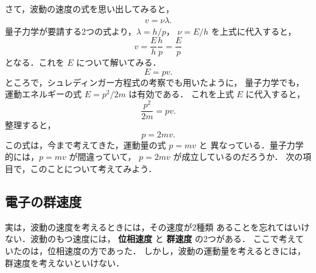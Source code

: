                 さて，波動の速度の式を思い出してみると，
                    \begin{align}
                        v  =  \nu \lambda.
                    \end{align}
                量子力学が要請する2つの式より，$\lambda = h/p$，
                $\nu = E/h$ を上式に代入すると，
                    \begin{equation*}
                        v = \frac{E}{h} \frac{h}{p} = \frac{E}{p}
                    \end{equation*}
                となる．これを $E$ について解いてみる．
                    \begin{equation*}
                        E = pv.
                    \end{equation*}
                ところで，シュレディンガー方程式の考察でも用いたように，
                量子力学でも，運動エネルギーの式 $E = p^{2}/2m$ は有効である．
                これを上式 $E$ に代入すると，
                    \begin{equation*}
                        \frac{p^{2}}{2m} = pv.
                    \end{equation*}
                整理すると，
                    \begin{equation*}
                        p = 2mv.
                    \end{equation*}
                この式は，今まで考えてきた，運動量の式 $p=mv$ と
                異なっている．量子力学的には，$p=mv$ が間違っていて，
                $p=2mv$ が成立しているのだろうか．
                次の項目で，このことについて考えてみよう．

            \subsection{電子の群速度}
                実は，波動の速度を考えるときには，その速度が2種類
                あることを忘れてはいけない．波動のもつ速度には，
                \textbf{位相速度} と \textbf{群速度} の2つがある．
                ここで考えていたのは，位相速度の方であった．
                しかし，波動の運動量を考えるときには，
                群速度を考えないといけない．


